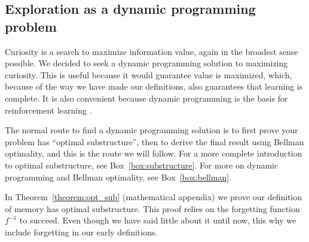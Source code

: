 \subsection{Exploration as a dynamic programming problem}
Curiosity is a search to maximize information value, again in the broadest sense possible. We decided to seek a dynamic programming solution to maximizing curiosity. This is useful because it would guarantee value is maximized, which, because of the way we have made our definitions, also guarantees that learning is complete. It is also convenient because dynamic programming is the basis for reinforcement learning \cite{Sutton2018}. 

The normal route to find a dynamic programming solution is to first prove your problem has ``optimal substructure'', then to derive the final result using Bellman optimality, and this is the route we will follow. For a more complete introduction to optimal substructure, see Box~\ref{box:substructure}. For more on dynamic programming and Bellman optimality, see Box~\ref{box:bellman}. 

In Theorem~\ref{theorem:opt_sub} (mathematical appendix) we prove our definition of memory has optimal substructure. This proof relies on the forgetting function $f^{-1}$ to succeed. Even though we have said little about it until now, this why we include forgetting in our early definitions. 

